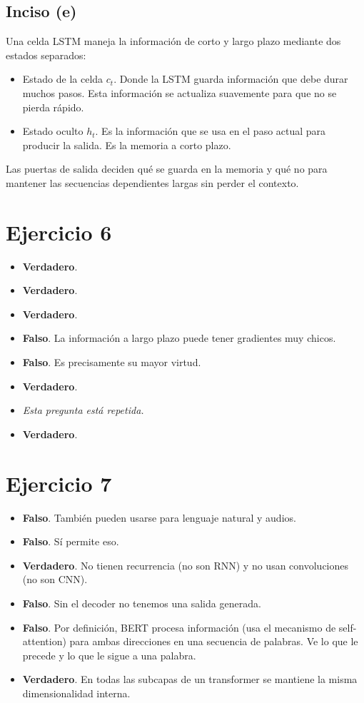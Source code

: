 \documentclass[12pt, a4paper]{article}
\begin{document}
        \subsection*{Inciso (e)}
            \noindent Una celda LSTM maneja la información de corto y largo plazo mediante dos estados separados:
            \begin{itemize}
                \item Estado de la celda $c_{t}$. Donde la LSTM guarda información que debe durar muchos pasos. Esta información se actualiza suavemente para que no se pierda rápido.
                \item Estado oculto $h_{t}$. Es la información que se usa en el paso actual para producir la salida. Es la memoria a corto plazo.
            \end{itemize}
            \noindent Las puertas de salida deciden qué se guarda en la memoria y qué no para mantener las secuencias dependientes largas sin perder el contexto.
    \section*{Ejercicio 6}
        \begin{itemize}
            \item \textbf{Verdadero}.
            \item \textbf{Verdadero}.
            \item \textbf{Verdadero}. 
            \item \textbf{Falso}. La información a largo plazo puede tener gradientes muy chicos.
            \item \textbf{Falso}. Es precisamente su mayor virtud.
            \item \textbf{Verdadero}.
            \item \textit{Esta pregunta está repetida.}
            \item \textbf{Verdadero}.
        \end{itemize}
    \section*{Ejercicio 7}
        \begin{itemize}
            \item \textbf{Falso}. También pueden usarse para lenguaje natural y audios.
            \item \textbf{Falso}. Sí permite eso.
            \item \textbf{Verdadero}. No tienen recurrencia (no son RNN) y no usan convoluciones (no son CNN).
            \item \textbf{Falso}. Sin el decoder no tenemos una salida generada.
            \item \textbf{Falso}. Por definición, BERT procesa información (usa el mecanismo de self-attention) para ambas direcciones en una secuencia de palabras. Ve lo que le precede y lo que le sigue a una palabra.
            \item \textbf{Verdadero}. En todas las subcapas de un transformer se mantiene la misma dimensionalidad interna.
        \end{itemize}
\end{document}
